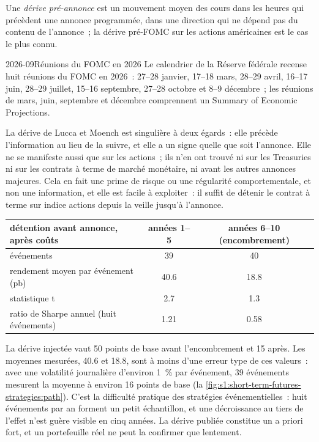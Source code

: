 \begin{definition}\label{def:s1:short-term-futures-strategies:pre}
Une \emph{dérive pré-annonce} est un mouvement moyen des cours dans les heures qui précèdent une annonce programmée, dans une direction
qui ne dépend pas du contenu de l'annonce~; la dérive pré-FOMC sur les actions américaines est le cas le plus connu.
\end{definition}

\begin{dated}{2026-09}{Réunions du FOMC en 2026}\label{dat:s1:short-term-futures-strategies:fomc}
Le calendrier de la Réserve fédérale recense huit réunions du FOMC en 2026~: 27--28 janvier, 17--18 mars, 28--29 avril, 16--17 juin, 28--29 juillet, 15--16
septembre, 27--28 octobre et 8--9 décembre~; les réunions de mars, juin, septembre et décembre comprennent un Summary of Economic Projections.
\end{dated}

La dérive de Lucca et Moench est singulière à deux égards~: elle précède l'information au lieu de la suivre, et elle a un signe quelle que soit l'annonce. Elle
ne se manifeste aussi que sur les actions~; ils n'en ont trouvé ni sur les Treasuries ni sur les contrats à terme de marché monétaire, ni avant les autres annonces majeures. Cela en fait une
prime de risque ou une régularité comportementale, et non une information, et elle est facile à exploiter~: il suffit de détenir le contrat à terme sur indice actions depuis la veille jusqu'à
l'annonce.

\begin{center}
\small
\begin{tabular}{@{}lcc@{}}
\toprule
détention avant annonce, après coûts & années 1--5 & années 6--10 (encombrement)\\
\midrule
événements & 39 & 40\\
rendement moyen par événement (pb) & 40.6 & 18.8\\
statistique t & 2.7 & 1.3\\
ratio de Sharpe annuel (huit événements) & 1.21 & 0.58\\
\bottomrule
\end{tabular}
\end{center}

La dérive injectée vaut 50 points de base avant l'encombrement et 15 après. Les moyennes mesurées, 40.6 et 18.8, sont à moins d'une erreur type de ces valeurs~: avec une
volatilité journalière d'environ 1~\% par événement, 39 événements mesurent la moyenne à environ 16 points de base (la \cref{fig:s1:short-term-futures-strategies:path}). C'est
la difficulté pratique des stratégies événementielles~: huit événements par an forment un petit échantillon, et une décroissance au tiers de l'effet n'est guère visible en cinq
années. La dérive publiée constitue un a priori fort, et un portefeuille réel ne peut la confirmer que lentement.

